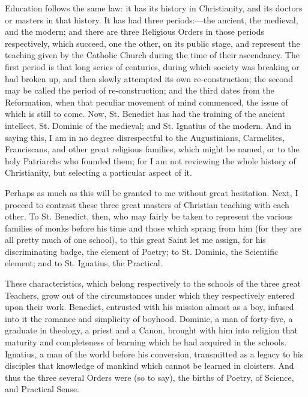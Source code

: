 Education follows the same law: it has its history in Christianity,
and its doctors or masters in that history. It has had three periods:—the
ancient, the medieval, and the modern; and there are three Religious
Orders in those periods respectively, which succeed, one the other, on
its public stage, and represent the teaching given by the
Catholic Church during the time of their ascendancy. The first period
is that long series of centuries, during which society was breaking or
had broken up, and then slowly attempted its own re-construction; the
second may be called the period of re-construction; and the third
dates from the Reformation, when that peculiar movement of mind
commenced, the issue of which is still to come. Now, St. Benedict has
had the training of the ancient intellect, St. Dominic of the
medieval; and St. Ignatius of the modern. And in saying this, I am in
no degree disrespectful to the Augustinians, Carmelites, Franciscans,
and other great religious families, which might be named, or to the
holy Patriarchs who founded them; for I am not reviewing the whole
history of Christianity, but selecting a particular aspect of it.

Perhaps as much as this will be granted to me without great
hesitation. Next, I proceed to contrast these three great masters of
Christian teaching with each other. To St. Benedict, then, who may
fairly be taken to represent the various families of monks before his
time and those which sprang from him (for they are all pretty much of
one school), to this great Saint let me assign, for his discriminating
badge, the element of Poetry; to St. Dominic, the Scientific element;
and to St. Ignatius, the Practical.

These characteristics, which belong respectively to the schools of
the three great Teachers, grow out of the circumstances under which
they respectively entered upon their work. Benedict, entrusted with
his mission almost as a boy, infused into it the romance and
simplicity of boyhood. Dominic, a man of forty-five, a graduate in
theology, a priest and a Canon, brought with him into religion that
maturity and completeness of learning which he had acquired in
the schools. Ignatius, a man of the world before his conversion,
transmitted as a legacy to his disciples that knowledge of mankind
which cannot be learned in cloisters. And thus the three several
Orders were (so to say), the births of Poetry, of Science, and
Practical Sense.

